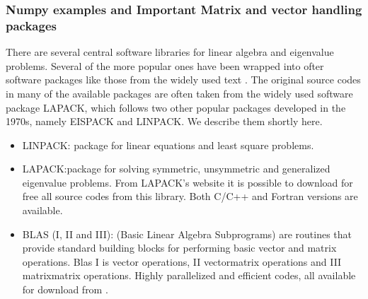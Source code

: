 \documentclass[letterpaper,10pt,english]{sphinxmanual}
\begin{document}
\subsubsection{Numpy examples and Important Matrix and vector handling packages}
\label{\detokenize{chapter2:numpy-examples-and-important-matrix-and-vector-handling-packages}}
There are several central software libraries for linear algebra and eigenvalue problems. Several of the more
popular ones have been wrapped into ofter software packages like those from the widely used text . The original source codes in many of the available packages are often taken from the widely used
software package LAPACK, which follows two other popular packages
developed in the 1970s, namely EISPACK and LINPACK.  We describe them shortly here.
\begin{itemize}
\item {} 
LINPACK: package for linear equations and least square problems.

\item {} 
LAPACK:package for solving symmetric, unsymmetric and generalized eigenvalue problems. From LAPACK’s website  it is possible to download for free all source codes from this library. Both C/C++ and Fortran versions are available.

\item {} 
BLAS (I, II and III): (Basic Linear Algebra Subprograms) are routines that provide standard building blocks for performing basic vector and matrix operations. Blas I is vector operations, II vector\sphinxhyphen{}matrix operations and III matrix\sphinxhyphen{}matrix operations. Highly parallelized and efficient codes, all available for download from .

\end{itemize}
\end{document}
